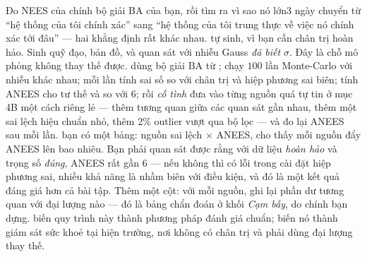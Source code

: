 \documentclass[../../vslam.tex]{subfiles}
\begin{document}
\begin{duan}{Đo NEES của chính bộ giải BA của bạn, rồi tìm ra vì sao nó lớn}{3 ngày}
\dmt chuyển từ ``hệ thống của tôi chính xác'' sang ``hệ thống của tôi trung thực về việc nó chính xác tới đâu'' --- hai khẳng định rất khác nhau.
\ddl tự sinh, vì bạn cần chân trị hoàn hảo. Sinh quỹ đạo, bản đồ, và quan sát với nhiễu Gauss \emph{đã biết} \(\sigma\). Đây là chỗ mô phỏng không thay thế được.
\dbc dùng bộ giải BA từ ; chạy \(100\) lần Monte-Carlo với nhiễu khác nhau; mỗi lần tính sai số so với chân trị và hiệp phương sai biên; tính ANEES cho tư thế và so với \(6\); rồi \emph{cố tình} đưa vào từng nguồn quá tự tin ở mục 4B một cách riêng lẻ --- thêm tương quan giữa các quan sát gần nhau, thêm một sai lệch hiệu chuẩn nhỏ, thêm \(2\%\) outlier vượt qua bộ lọc --- và đo lại ANEES sau mỗi lần.
\dxk bạn có một bảng: nguồn sai lệch \(\times\) ANEES, cho thấy mỗi nguồn đẩy ANEES lên bao nhiêu. Bạn phải quan sát được rằng với dữ liệu \emph{hoàn hảo} và trọng số \emph{đúng}, ANEES rất gần \(6\) --- nếu không thì có lỗi trong cài đặt hiệp phương sai, nhiều khả năng là nhầm biên với điều kiện, và đó là một kết quả đáng giá hơn cả bài tập. Thêm một cột: với mỗi nguồn, ghi lại phần dư tương quan với đại lượng nào --- đó là bảng chẩn đoán ở khối \emph{Cạm bẫy}, do chính bạn dựng.
\dnv {} biến quy trình này thành phương pháp đánh giá chuẩn;  biến nó thành giám sát sức khoẻ tại hiện trường, nơi không có chân trị và phải dùng đại lượng thay thế.
\end{duan}
\end{document}
